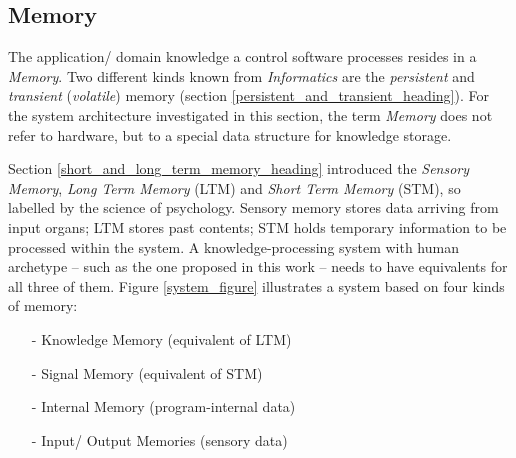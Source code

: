 %
%
%
%
%
%
%

\subsection{Memory}
\label{memory_heading}

The application/ domain knowledge a control software processes resides in a
\emph{Memory}. Two different kinds known from \emph{Informatics} are the
\emph{persistent} and \emph{transient} (\emph{volatile}) memory (section
\ref{persistent_and_transient_heading}). For the system architecture
investigated in this section, the term \emph{Memory} does not refer to
hardware, but to a special data structure for knowledge storage.

Section \ref{short_and_long_term_memory_heading} introduced the
\emph{Sensory Memory}, \emph{Long Term Memory} (LTM) and \emph{Short Term Memory}
(STM), so labelled by the science of psychology. Sensory memory stores data
arriving from input organs; LTM stores past contents; STM holds temporary
information to be processed within the system. A knowledge-processing system
with human archetype -- such as the one proposed in this work -- needs to have
equivalents for all three of them. Figure \ref{system_figure} illustrates a
system based on four kinds of memory:

\begin{itemize}
    \item[-] Knowledge Memory (equivalent of LTM)
    \item[-] Signal Memory (equivalent of STM)
    \item[-] Internal Memory (program-internal data)
    \item[-] Input/ Output Memories (sensory data)
\end{itemize}

